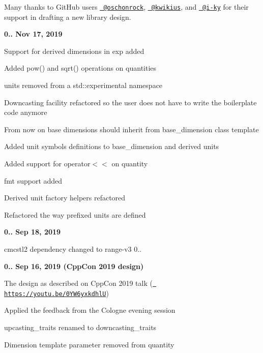 \begin{DoxyItemize}
Many thanks to Git\+Hub users \href{https://github.com/oschonrock}{\texttt{ @oschonrock}}, \href{https://github.com/kwikius}{\texttt{ @kwikius}}, and \href{https://github.com/i-ky}{\texttt{ @i-\/ky}} for their support in drafting a new library design.
\item {\bfseries{0.. Nov 17, 2019}}
\begin{DoxyItemize}
\item Support for derived dimensions in {\ttfamily exp} added
\item Added {\ttfamily pow()} and {\ttfamily sqrt()} operations on quantities
\item {\ttfamily units} removed from a {\ttfamily std\+::experimental} namespace
\item Downcasting facility refactored so the user does not have to write the boilerplate code anymore
\item From now on base dimensions should inherit from {\ttfamily base\+\_\+dimension} class template
\item Added unit symbols definitions to {\ttfamily base\+\_\+dimension} and derived units
\item Added support for {\ttfamily operator\texorpdfstring{$<$}{<}\texorpdfstring{$<$}{<}} on {\ttfamily quantity}
\item {\ttfamily fmt} support added
\item Derived unit factory helpers refactored
\item Refactored the way prefixed units are defined
\end{DoxyItemize}
\item {\bfseries{0.. Sep 18, 2019}}
\begin{DoxyItemize}
\item cmcstl2 dependency changed to range-\/v3 0..
\end{DoxyItemize}
\item {\bfseries{0.. Sep 16, 2019 (Cpp\+Con 2019 design)}}
\begin{DoxyItemize}
\item The design as described on Cpp\+Con 2019 talk (\href{https://youtu.be/0YW6yxkdhlU}{\texttt{ https\+://youtu.\+be/0\+YW6yxkdhlU}})
\item Applied the feedback from the Cologne evening session
\begin{DoxyItemize}
\item {\ttfamily upcasting\+\_\+traits} renamed to {\ttfamily downcasting\+\_\+traits}
\item {\ttfamily Dimension} template parameter removed from quantity

\end{DoxyItemize}
\end{DoxyItemize}
\end{DoxyItemize}
